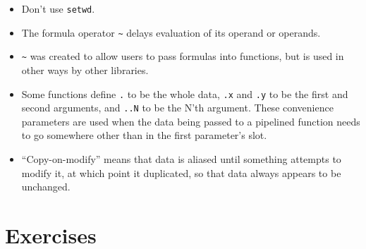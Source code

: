 \begin{itemize}
\item
  Don't use \texttt{setwd}.
\item
  The formula operator \texttt{{\textasciitilde}} delays evaluation of its operand or operands.
\item
  \texttt{{\textasciitilde}} was created to allow users to pass formulas into functions,
  but is used in other ways by other libraries.
\item
  Some functions define \texttt{.} to be the whole data,
  \texttt{.x} and \texttt{.y} to be the first and second arguments,
  and \texttt{..N} to be the N'th argument.
  These convenience parameters are used
  when the data being passed to a pipelined function needs to go somewhere other than in the first parameter's slot.
\item
  ``Copy-on-modify'' means that data is aliased until something attempts to modify it,
  at which point it duplicated,
  so that data always appears to be unchanged.
\end{itemize}

\section{Exercises}

